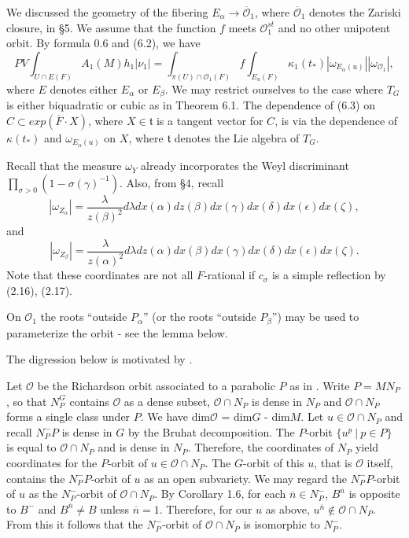 \documentclass[12pt,letterpaper]{amsart}
\newcommand{\ovF}{\overline{F}}
\begin{document}
We discussed the geometry of the fibering $E_\alpha\rightarrow
\overline{{\mathcal O}}_1$, where $\overline{{\mathcal O}}_1$ denotes the
Zariski closure, in \S 5.
We assume that the function $f$ meets ${\mathcal O}_1^{st}$ and no other
unipotent orbit.
By formula 0.6 and (6.2), we have
\[
PV\int_{U\cap E(F)}A_1(M)h_1|\nu_1|
=\int_{\pi(U)\cap {\mathcal O}_1(F)}f\int_{E_u(F)}
\kappa_1(t_*)|\omega_{E_\alpha(u)}||\omega_{{\mathcal O}_1}|,
\tag{6.3}
\]
where $E$ denotes either $E_\alpha$ or $E_\beta$.
We may restrict ourselves to
the case where $T_G$ is either biquadratic or cubic
as in Theorem 6.1. The dependence of (6.3) on
$C\subset exp(\ovF\cdot X)$, where $X\in {\mathfrak t}$ is a tangent vector
for $C$, is via the dependence of $\kappa(t_*)$ and $\omega_{E_\alpha(u)}$
on $X$, where ${\mathfrak t}$ denotes the Lie algebra of $T_G$.

Recall \cite[Lemma 2.12]{La83} that the measure $\omega_Y$ already incorporates
the Weyl discriminant $\prod_{\sigma >0}(1-\sigma(\gamma)^{-1})$.
Also, from \S 4, recall
\[
|\omega_{Z_\alpha}|=
\frac{\lambda}{z(\beta)^2}d\lambda dx(\alpha) dz(\beta)dx(\gamma)
dx(\delta)dx(\epsilon)dx(\zeta),
\]
and
\[
|\omega_{Z_\beta}|=
\frac{\lambda}{z(\alpha)^2}d\lambda dz(\alpha) dx(\beta)dx(\gamma)
dx(\delta)dx(\epsilon)dx(\zeta).
\]
Note that these coordinates are not all $F$-rational if $c_\sigma$ is a
simple reflection by (2.16), (2.17).

On ${\mathcal O}_1$ the roots ``outside $P_\alpha$'' (or the
roots ``outside $P_\beta$'') may be used to
parameterize the orbit - see the lemma below.

The digression below is motivated by \cite[Remark V.2.2]{Ha92a}.

Let ${\mathcal O}$ be the Richardson orbit associated to a parabolic $P$
as in \cite[Theorem 2, \S 3.9]{St74}. Write $P=MN_P$, so that $N_P^G$
contains ${\mathcal O}$ as a dense subset, ${\mathcal O}\cap N_P$ is dense in
$N_P$ and ${\mathcal O}\cap N_P$ forms a single class under $P$. We have
dim${\mathcal O}$ = dim$G$ - dim$M$. Let $u\in {\mathcal O}\cap N_P$ and recall
$N_P^- P$ is dense in $G$ by the Bruhat decomposition. The $P$-orbit
$\{u^p\ |\ p\in P\}$ is equal to ${\mathcal O}\cap N_P$ and is dense in $N_P$.
Therefore, the coordinates of $N_P$ yield coordinates for the $P$-orbit
of $u\in {\mathcal O}\cap N_P$. The $G$-orbit of this $u$, that is
${\mathcal O}$ itself, contains the $N_P^- P$-orbit of $u$ as an open
subvariety. We may regard the $N_P^- P$-orbit of $u$ as the
$N_P^-$-orbit of ${\mathcal O}\cap N_P$. By Corollary 1.6, for each
$\overline{n}\in N_P^-$, $B^{\overline{n}}$ is opposite to
$B^-$ and $B^{\overline{n}}\not= B$ unless $\overline{n}=1$.
Therefore, for our $u$ as above, $u^{\overline{n}}\notin {\mathcal O}\cap N_P$.
From this it follows that the $N_P^-$-orbit of ${\mathcal O}\cap N_P$
is isomorphic to $N_P^-$.
\end{document}
